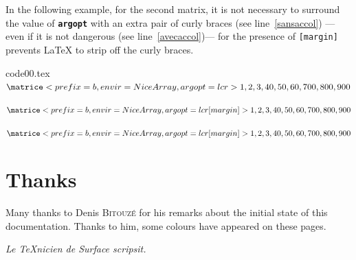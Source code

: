 \documentclass[full]{l3doc}
\newcommand{\ObjetPres}[2]{\textcolor{#1}{\textbf{\texttt{#2}}}}
\newcommand{\keyname}{\ObjetPres{keycolor}}
\newcommand{\UnExemple}{%
  \par \medskip \par \noindent
  \begin{minipage}[c]{0.66\linewidth}
    
  \end{minipage}
  \hspace{\stretch{1}}
  \begin{minipage}[c]{0.32\linewidth}
    \small
    
  \end{minipage}
  \par \medbreak}
\begin{document}
\medskip{}

In the following example, for the second matrix, it is not necessary to surround
the value of \keyname{argopt} with an extra pair of curly braces (see
line~\ref{sansaccol}) ---even if it is not dangerous (see
line~\ref{avecaccol})--- for the presence of \texttt{[margin]} prevents \LaTeX{}
to strip off the curly braces.

\begin{VerbatimOut}[gobble=0]{code00.tex}
$\matrice<prefix=b, envir=NiceArray,
argopt={{l c r}}>{1, 2, 3, 40, 50, 60,
  700, 800, 900}$
\par \medskip
$\matrice<prefix=b, envir=NiceArray,
argopt={l c r}[margin]>{1, 2, 3, %
  40, 50, 60, 700, 800, 900}$
\par \medskip
$\matrice<prefix=b, envir=NiceArray,
argopt={{l c r}[margin]}>{1, 2, 3, %
  40, 50, 60, 700, 800, 900}$
\end{VerbatimOut}
\UnExemple{}

 \section{Thanks}
Many thanks to Denis \textsc{Bitouzé} for his remarks about the initial state of
this documentation. Thanks to him, some colours have appeared on these pages.


\noindent\hspace*{0.2\textwidth}\hrulefill\hspace*{0.2\textwidth}
\begin{center}
  \textsl{Le TeXnicien de Surface scripsit.}
\end{center}
\noindent\hspace*{0.2\textwidth}\hrulefill\hspace*{0.2\textwidth}

\end{document}
